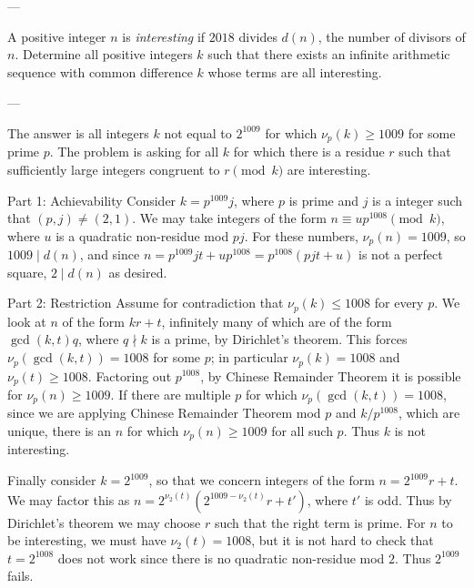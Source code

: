 
---

A positive integer $n$ is \emph{interesting} if $2018$ divides $d(n)$, the number of divisors of $n$. Determine all positive integers $k$ such that there exists an infinite arithmetic sequence with common difference $k$ whose terms are all interesting.

---

The answer is all integers $k$ not equal to $2^{1009}$ for which $\nu_p(k)\ge1009$ for some prime $p$. The problem is asking for all $k$ for which there is a residue $r$ such that sufficiently large integers congruent to $r\pmod k$ are interesting.
\begin{customenv}{Part 1: Achievability}
    Consider $k=p^{1009}j$, where $p$ is prime and $j$ is a integer such that $(p,j)\ne(2,1)$. We may take integers of the form $n\equiv up^{1008}\pmod{k}$, where $u$ is a quadratic non-residue mod $pj$. For these numbers, $\nu_p(n)=1009$, so $1009\mid d(n)$, and since $n=p^{1009}jt+up^{1008}=p^{1008}(pjt+u)$ is not a perfect square, $2\mid d(n)$ as desired.
\end{customenv}
\begin{customenv}{Part 2: Restriction}
    Assume for contradiction that $\nu_p(k)\le1008$ for every $p$. We look at $n$ of the form $kr+t$, infinitely many of which are of the form $\gcd(k,t)q$, where $q\nmid k$ is a prime, by Dirichlet's theorem. This forces $\nu_p(\gcd(k,t))=1008$ for some $p$; in particular $\nu_p(k)=1008$ and $\nu_p(t)\ge1008$. Factoring out $p^{1008}$, by Chinese Remainder Theorem it is possible for $\nu_p(n)\ge1009$. If there are multiple $p$ for which $\nu_p(\gcd(k,t))=1008$, since we are applying Chinese Remainder Theorem mod $p$ and $k/p^{1008}$, which are unique, there is an $n$ for which $\nu_p(n)\ge1009$ for all such $p$. Thus $k$ is not interesting.

    Finally consider $k=2^{1009}$, so that we concern integers of the form $n=2^{1009}r+t$. We may factor this as $n=2^{\nu_2(t)}(2^{1009-\nu_2(t)}r+t')$, where $t'$ is odd. Thus by Dirichlet's theorem we may choose $r$ such that the right term is prime. For $n$ to be interesting, we must have $\nu_2(t)=1008$, but it is not hard to check that $t=2^{1008}$ does not work since there is no quadratic non-residue mod $2$. Thus $2^{1009}$ fails.
\end{customenv}

